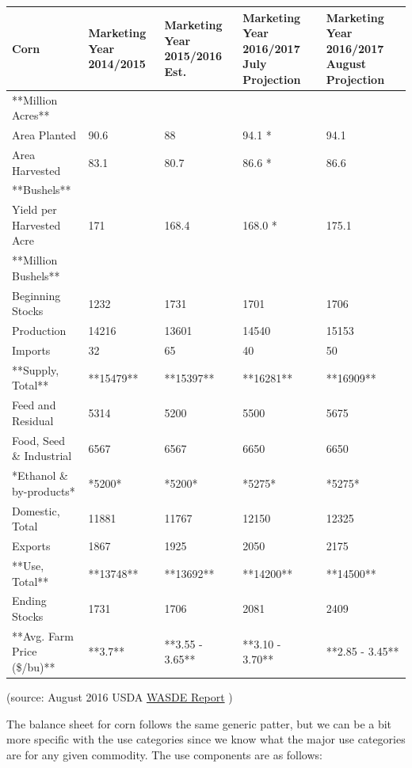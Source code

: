 \documentclass[]{book}
\theoremstyle{definition}
\theoremstyle{definition}
\theoremstyle{remark}
\begin{document}
\begin{tabular}{l|l|l|l|l}
\hline
Corn & Marketing Year 2014/2015 & Marketing Year 2015/2016 Est. & Marketing Year 2016/2017 July Projection & Marketing Year 2016/2017 August Projection\\
\hline
**Million Acres** &  &  &  & \\
\hline
Area Planted & 90.6 & 88 & 94.1 * & 94.1\\
\hline
Area Harvested & 83.1 & 80.7 & 86.6 * & 86.6\\
\hline
**Bushels** &  &  &  & \\
\hline
Yield per Harvested Acre & 171 & 168.4 & 168.0 * & 175.1\\
\hline
**Million Bushels** &  &  &  & \\
\hline
Beginning Stocks & 1232 & 1731 & 1701 & 1706\\
\hline
Production & 14216 & 13601 & 14540 & 15153\\
\hline
Imports & 32 & 65 & 40 & 50\\
\hline
**Supply, Total** & **15479** & **15397** & **16281** & **16909**\\
\hline
Feed and Residual & 5314 & 5200 & 5500 & 5675\\
\hline
Food, Seed \& Industrial & 6567 & 6567 & 6650 & 6650\\
\hline
*Ethanol \& by-products* & *5200* & *5200* & *5275* & *5275*\\
\hline
Domestic, Total & 11881 & 11767 & 12150 & 12325\\
\hline
Exports & 1867 & 1925 & 2050 & 2175\\
\hline
**Use, Total** & **13748** & **13692** & **14200** & **14500**\\
\hline
Ending Stocks & 1731 & 1706 & 2081 & 2409\\
\hline
**Avg. Farm Price (\$/bu)** & **3.7** & **3.55 - 3.65** & **3.10 - 3.70** & **2.85 - 3.45**\\
\hline
\end{tabular}

(source: August 2016 USDA
\href{http://usda.mannlib.cornell.edu/MannUsda/viewDocumentInfo.do?documentID=1194}{WASDE
Report} )

The balance sheet for corn follows the same generic patter, but we can
be a bit more specific with the use categories since we know what the
major use categories are for any given commodity. The use components are
as follows:
\end{document}

